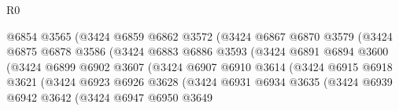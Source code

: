 \begin{lexlean}{R0}
\begin{coremodule}
                                  @6854
                                  @3565
                                  (@3424
                                    @6859
                                    @6862
                                    @3572
                                    (@3424
                                      @6867
                                      @6870
                                      @3579
                                      (@3424
                                        @6875
                                        @6878
                                        @3586
                                        (@3424
                                          @6883
                                          @6886
                                          @3593
                                          (@3424
                                            @6891
                                            @6894
                                            @3600
                                            (@3424
                                              @6899
                                              @6902
                                              @3607
                                              (@3424
                                                @6907
                                                @6910
                                                @3614
                                                (@3424
                                                  @6915
                                                  @6918
                                                  @3621
                                                  (@3424
                                                    @6923
                                                    @6926
                                                    @3628
                                                    (@3424
                                                      @6931
                                                      @6934
                                                      @3635
                                                      (@3424
                                                        @6939
                                                        @6942
                                                        @3642
                                                        (@3424
                                                          @6947
                                                          @6950
                                                          @3649

\end{coremodule}
\end{lexlean}
